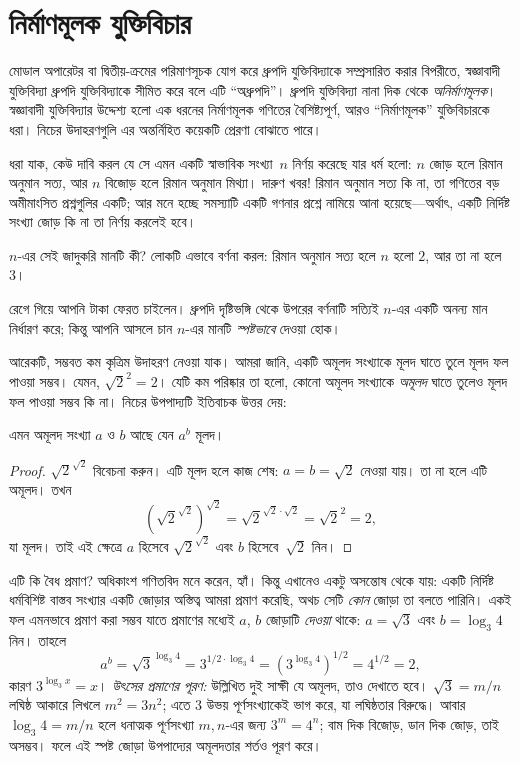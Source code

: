 \documentclass[../../../include/open-logic-chapter]{subfiles}
\begin{document}

\section{নির্মাণমূলক যুক্তিবিচার}

মোডাল অপারেটর বা দ্বিতীয়-ক্রমের পরিমাণসূচক যোগ করে ধ্রুপদি যুক্তিবিদ্যাকে
সম্প্রসারিত করার বিপরীতে, স্বজ্ঞাবাদী যুক্তিবিদ্যা ধ্রুপদি যুক্তিবিদ্যাকে
সীমিত করে বলে এটি ``অধ্রুপদি''। ধ্রুপদি যুক্তিবিদ্যা নানা দিক থেকে
\emph{অনির্মাণমূলক}। স্বজ্ঞাবাদী যুক্তিবিদ্যার উদ্দেশ্য হলো এক ধরনের
নির্মাণমূলক গণিতের বৈশিষ্ট্যপূর্ণ, আরও ``নির্মাণমূলক'' যুক্তিবিচারকে
ধরা। নিচের উদাহরণগুলি এর অন্তর্নিহিত কয়েকটি প্রেরণা বোঝাতে পারে।

ধরা যাক, কেউ দাবি করল যে সে এমন একটি স্বাভাবিক সংখ্যা~$n$ নির্ণয় করেছে
যার ধর্ম হলো: $n$ জোড় হলে রিমান অনুমান সত্য, আর $n$ বিজোড় হলে
রিমান অনুমান মিথ্যা। দারুণ খবর!{} রিমান অনুমান সত্য কি না, তা গণিতের
বড় অমীমাংসিত প্রশ্নগুলির একটি; আর মনে হচ্ছে সমস্যাটি একটি গণনার
প্রশ্নে নামিয়ে আনা হয়েছে---অর্থাৎ, একটি নির্দিষ্ট সংখ্যা জোড় কি
না তা নির্ণয় করলেই হবে।

$n$-এর সেই জাদুকরি মানটি কী? লোকটি এভাবে বর্ণনা করল: রিমান অনুমান
সত্য হলে $n$ হলো $2$, আর তা না হলে $3$।

রেগে গিয়ে আপনি টাকা ফেরত চাইলেন। ধ্রুপদি দৃষ্টিভঙ্গি থেকে উপরের
বর্ণনাটি সত্যিই $n$-এর একটি অনন্য মান নির্ধারণ করে; কিন্তু আপনি আসলে
চান $n$-এর মানটি \emph{স্পষ্টভাবে} দেওয়া হোক।

আরেকটি, সম্ভবত কম কৃত্রিম উদাহরণ নেওয়া যাক। আমরা জানি, একটি অমূলদ
সংখ্যাকে মূলদ ঘাতে তুলে মূলদ ফল পাওয়া সম্ভব। যেমন,
$\sqrt{2}^2 = 2$। যেটি কম পরিষ্কার তা হলো, কোনো অমূলদ সংখ্যাকে
\emph{অমূলদ} ঘাতে তুলেও মূলদ ফল পাওয়া সম্ভব কি না। নিচের উপপাদ্যটি
ইতিবাচক উত্তর দেয়:

\begin{thm}
এমন অমূলদ সংখ্যা $a$ ও $b$ আছে যেন $a^b$ মূলদ।
\end{thm}

\begin{proof}
$\sqrt{2}^{\sqrt{2}}$ বিবেচনা করুন। এটি মূলদ হলে কাজ শেষ: $a = b =
\sqrt{2}$ নেওয়া যায়। তা না হলে এটি অমূলদ। তখন
\[
(\sqrt{2}^{\sqrt{2}})^{\sqrt{2}} = \sqrt{2}^{\sqrt{2} \cdot
  \sqrt{2}} = \sqrt{2}^2 = 2,
\]
যা মূলদ। তাই এই ক্ষেত্রে $a$ হিসেবে
$\sqrt{2}^{\sqrt{2}}$ এবং $b$ হিসেবে~$\sqrt 2$ নিন।
\end{proof}

এটি কি বৈধ প্রমাণ? অধিকাংশ গণিতবিদ মনে করেন, হ্যাঁ। কিন্তু এখানেও
একটু অসন্তোষ থেকে যায়: একটি নির্দিষ্ট ধর্মবিশিষ্ট বাস্তব সংখ্যার
একটি জোড়ার অস্তিত্ব আমরা প্রমাণ করেছি, অথচ সেটি \emph{কোন} জোড়া তা
বলতে পারিনি। একই ফল এমনভাবে প্রমাণ করা সম্ভব যাতে প্রমাণের মধ্যেই
$a$, $b$ জোড়াটি \emph{দেওয়া} থাকে: $a = \sqrt{3}$ এবং $b = \log_3
4$ নিন। তাহলে
\[
a^b = \sqrt{3}^{\log_3 4} = 3^{1/2 \cdot \log_3 4} = (3^{\log_3
  4})^{1/2} = 4^{1/2}= 2,
\]
কারণ $3^{\log_3 x} = x$।
\emph{উৎসের প্রমাণের পূরণ:} উল্লিখিত দুই সাক্ষী যে অমূলদ, তাও দেখাতে হবে। $\sqrt{3}=m/n$ লঘিষ্ঠ আকারে লিখলে $m^2=3n^2$; এতে $3$ উভয় পূর্ণসংখ্যাকেই ভাগ করে, যা লঘিষ্ঠতার বিরুদ্ধে। আবার $\log_3 4=m/n$ হলে ধনাত্মক পূর্ণসংখ্যা $m,n$-এর জন্য $3^m=4^n$; বাম দিক বিজোড়, ডান দিক জোড়, তাই অসম্ভব। ফলে এই স্পষ্ট জোড়া উপপাদ্যের অমূলদতার শর্তও পূরণ করে।
\end{document}
